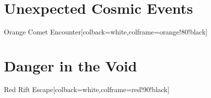 \documentclass[a6single]{checklist}
\begin{document}
\abnormalchapter
\section{Unexpected Cosmic Events}
\begin{checklist}{Orange Comet Encounter}[colback=white,colframe=orange!80!black]
\end{checklist}

\emergencychapter
\section{Danger in the Void}
\begin{checklist}{Red Rift Escape}[colback=white,colframe=red!90!black]
\end{checklist}
\end{document}
